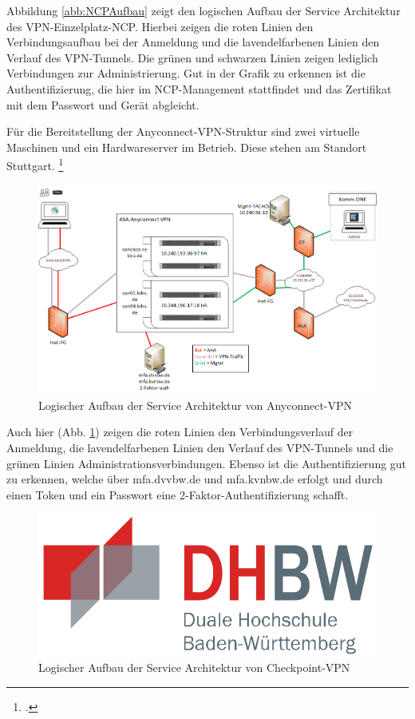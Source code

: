 Abbildung \ref{abb:NCPAufbau} zeigt den logischen Aufbau der Service Architektur des VPN-Einzelplatz-NCP. Hierbei zeigen die roten Linien den Verbindungsaufbau bei der Anmeldung und die lavendelfarbenen Linien den Verlauf des VPN-Tunnels. Die grünen und schwarzen Linien zeigen lediglich Verbindungen zur Administrierung. Gut in der Grafik zu erkennen ist die Authentifizierung, die hier im NCP-Management stattfindet und das Zertifikat mit dem Passwort und Gerät abgleicht.

Für die Bereitstellung der Anyconnect-VPN-Struktur sind zwei virtuelle Maschinen und ein Hardwareserver im Betrieb. Diese stehen am Standort Stuttgart. \footcite[Vgl.][auch im Folgenden]{Beier.2022b}

\begin{figure}[htb]
  \centering
  \includegraphics[width=14cm]{graphics/Anyconnect.png}
  \caption[Logischer Aufbau der Service Architektur von Anyconnect-VPN]{Logischer Aufbau der Service Architektur von Anyconnect-VPN \footnotemark}
  \label{abb:AnyconnectAufbau}
\end{figure}

Auch hier (Abb. \ref{abb:AnyconnectAufbau}) zeigen die roten Linien den Verbindungsverlauf der Anmeldung, die lavendelfarbenen Linien den Verlauf des VPN-Tunnels und die grünen Linien Administrationsverbindungen. Ebenso ist die Authentifizierung gut zu erkennen, welche über mfa.dvvbw.de und mfa.kvnbw.de erfolgt und durch einen Token und ein Passwort eine 2-Faktor-Authentifizierung schafft. 

\begin{figure}[htb]
  \centering
  \includegraphics[width=14cm]{graphics/dhbw.png}
  \caption[Logischer Aufbau der Service Architektur von Checkpoint-VPN]{Logischer Aufbau der Service Architektur von Checkpoint-VPN}
  \label{abb:CheckpointAufbau}
\end{figure}

